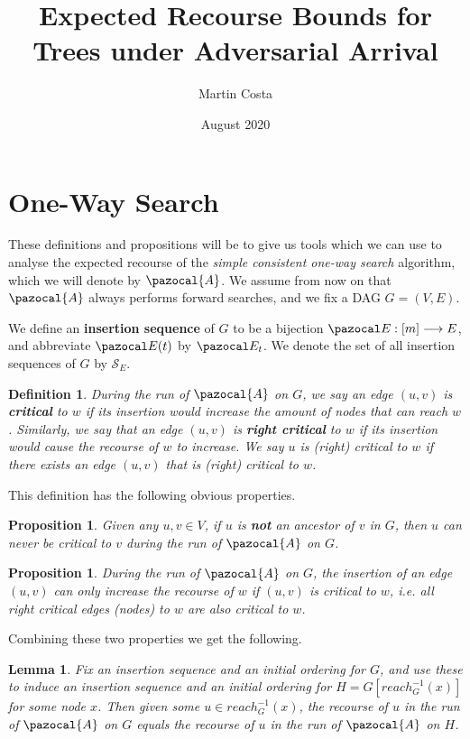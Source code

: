 \documentclass{article}
\title{Expected Recourse Bounds for Trees under Adversarial Arrival}
\author{Martin Costa}
\date{August 2020}
\newtheorem{lemma}[theorem]{Lemma}
\newtheorem{proposition}[theorem]{Proposition}
\newtheorem{definition}[theorem]{Definition}
\begin{document}
\maketitle

\section{One-Way Search}

These definitions and propositions will be to give us tools which we can use to analyse the expected recourse of the \textit{simple consistent one-way search} algorithm, which we will denote by $\pazocal{A}$. We assume from now on that $\pazocal{A}$ always performs forward searches, and we fix a DAG $G=(V,E)$.

We define an \textbf{insertion sequence} of $G$ to be a bijection $\pazocal E : [m] \longrightarrow E$, and abbreviate $\pazocal E(t)$ by $\pazocal E_t$. We denote the set of all insertion sequences of $G$ by $\mathcal S_E$.

\begin{definition}
During the run of $\pazocal{A}$ on $G$, we say an edge $(u,v)$ is \textbf{critical} to $w$ if its insertion would increase the amount of nodes that can reach $w$. Similarly, we say that an edge $(u,v)$ is \textbf{right critical} to $w$ if its insertion would cause the recourse of $w$ to increase. We say $u$ is (right) critical to $w$ if there exists an edge $(u,v)$ that is (right) critical to $w$.
\end{definition}

This definition has the following obvious properties.

\begin{proposition}
Given any $u,v \in V$, if $u$ is \textbf{not} an ancestor of $v$ in $G$, then $u$ can never be critical to $v$ during the run of $\pazocal{A}$ on $G$. 
\end{proposition}

\begin{proposition}
During the run of $\pazocal{A}$ on $G$, the insertion of an edge $(u,v)$ can only increase the recourse of $w$ if $(u,v)$ is critical to $w$, i.e. all right critical edges (nodes) to $w$ are also critical to $w$.
\end{proposition}

Combining these two properties we get the following.

\begin{lemma}
Fix an insertion sequence and an initial ordering for $G$, and use these to induce an insertion sequence and an initial ordering for $H = G[reach^{-1}_{G}(x)]$ for some node $x$. Then given some $u \in reach^{-1}_{G}(x)$, the recourse of $u$ in the run of $\pazocal{A}$ on $G$ equals the recourse of $u$ in the run of $\pazocal{A}$ on $H$.
\end{lemma}
\end{document}

